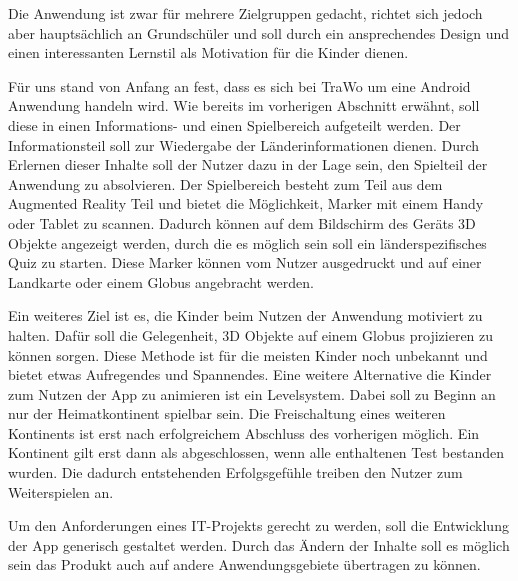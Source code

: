 Die Anwendung ist zwar für mehrere Zielgruppen gedacht, richtet sich jedoch aber hauptsächlich an Grundschüler und soll durch ein ansprechendes Design und einen interessanten Lernstil als Motivation für die Kinder dienen.

Für uns stand von Anfang an fest, dass es sich bei TraWo um eine Android Anwendung handeln wird. Wie bereits im vorherigen Abschnitt erwähnt, soll diese in einen Informations- und einen Spielbereich aufgeteilt werden. Der Informationsteil soll zur Wiedergabe der Länderinformationen dienen. Durch Erlernen dieser Inhalte soll der Nutzer dazu in der Lage sein, den Spielteil der Anwendung zu absolvieren. Der Spielbereich besteht zum Teil aus dem Augmented Reality Teil und bietet die Möglichkeit, Marker mit einem Handy oder Tablet zu scannen. Dadurch können auf dem Bildschirm des Geräts 3D Objekte angezeigt werden, durch die es möglich sein soll ein länderspezifisches Quiz zu starten. Diese Marker können vom Nutzer ausgedruckt und auf einer Landkarte oder einem Globus angebracht werden.

Ein weiteres Ziel ist es, die Kinder beim Nutzen der Anwendung motiviert zu halten. Dafür soll die Gelegenheit, 3D Objekte auf einem Globus projizieren zu können sorgen. Diese Methode ist für die meisten Kinder noch unbekannt und bietet etwas Aufregendes und Spannendes. Eine weitere Alternative die Kinder zum Nutzen der App zu animieren ist ein Levelsystem. Dabei soll zu Beginn an nur der Heimatkontinent spielbar sein. Die Freischaltung eines weiteren Kontinents ist erst nach erfolgreichem Abschluss des vorherigen möglich. Ein Kontinent gilt erst dann als abgeschlossen, wenn alle enthaltenen Test bestanden wurden. Die dadurch entstehenden Erfolgsgefühle treiben den Nutzer zum Weiterspielen an.

Um den Anforderungen eines IT-Projekts gerecht zu werden, soll die Entwicklung der App generisch gestaltet werden. Durch das Ändern der Inhalte soll es möglich sein das Produkt auch auf andere Anwendungsgebiete übertragen zu können.


